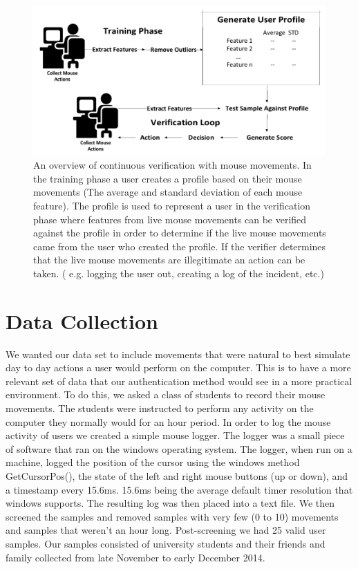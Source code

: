 \documentclass[conference]{IEEEtran}
\begin{document}
\begin{figure}[h!]
  \includegraphics[width=1\linewidth]{Overview.pdf}
\caption{An overview of continuous verification with mouse movements. In the training phase a user creates a profile based on their mouse movements (The average and standard deviation of each mouse feature). The profile is used to represent a user in the verification phase where features from live mouse movements can be verified against the profile in order to determine if the live mouse movements came from the user who created the profile. If the verifier determines that the live mouse movements are illegitimate an action can be taken. ( e.g. logging the user out, creating a log of the incident, etc.)}
\end{figure}


\section{Data Collection}
We wanted our data set to include movements that were natural to best simulate day to day actions a user would perform on the computer. This is to have a more relevant set of data that our authentication method would see in a more practical environment. To do this, we asked a class of students to record their mouse movements. The students were instructed to perform any activity on the computer they normally would for an hour period.
	In order to log the mouse activity of users we created a simple mouse logger.  The logger was a small piece of software that ran on the windows operating system. The logger, when run on a machine, logged the position of the cursor using the windows method GetCursorPos(), the state of the left and right mouse buttons (up or down), and a timestamp every 15.6ms. 15.6ms being the average default timer resolution that windows supports. The resulting log was then placed into a text file. 
We then screened the samples and removed samples with very few (0 to 10) movements and samples that weren't an hour long. Post-screening we had 25 valid user samples.  Our samples consisted of university students and their friends and family collected from late November to early December 2014.
\end{document}
